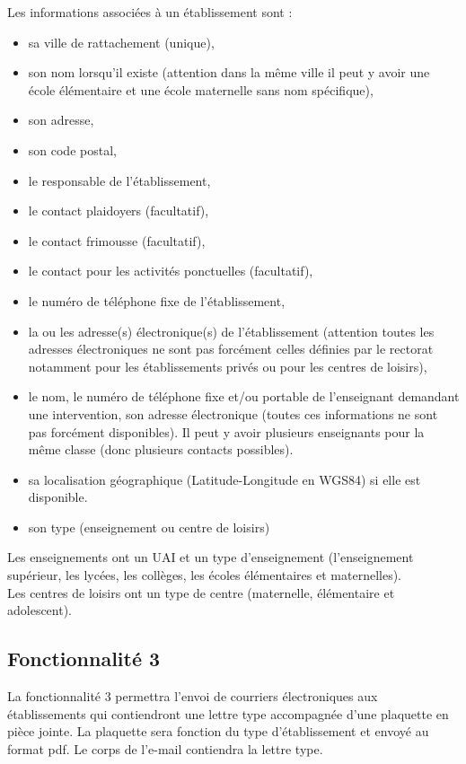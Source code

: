 Les informations associées à un établissement sont :
\begin{itemize}
\item sa ville de rattachement (unique), 
\item son nom lorsqu'il existe (attention dans la même ville il peut y avoir une école élémentaire et une école maternelle sans nom spécifique), 
\item son adresse,
\item son code postal,
\item le responsable de l'établissement, 
\item le contact plaidoyers (facultatif),
\item le contact frimousse (facultatif),
\item le contact pour les activités ponctuelles (facultatif),
\item le numéro de téléphone fixe de l'établissement, 
\item la ou les adresse(s) électronique(s) de l'établissement (attention toutes les adresses électroniques ne sont pas forcément celles définies par le rectorat notamment pour les établissements privés ou pour les centres de loisirs), 
\item le nom, le numéro de téléphone fixe et/ou portable de l'enseignant demandant une intervention, son adresse électronique (toutes ces informations ne sont pas forcément disponibles). Il peut y avoir plusieurs enseignants pour la même classe (donc plusieurs contacts possibles).
\item sa localisation géographique (Latitude-Longitude en WGS84) si elle est disponible.
\item son type (enseignement ou centre de loisirs)
\\
\end{itemize}
Les enseignements ont un UAI et un type d'enseignement (l'enseignement supérieur, les lycées, les collèges, les écoles élémentaires et maternelles). \\
Les centres de loisirs ont un type de centre (maternelle, élémentaire et adolescent). 


\subsection{Fonctionnalité 3}
La fonctionnalité 3 permettra l'envoi de courriers électroniques aux établissements qui contiendront une lettre type accompagnée d'une plaquette en pièce jointe. La plaquette sera fonction du type d'établissement et envoyé au format pdf. Le corps de l'e-mail contiendra la lettre type. 

